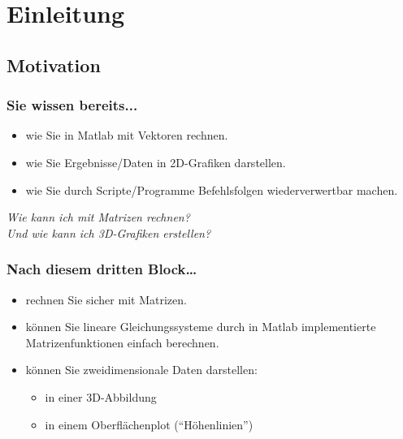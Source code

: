 



\setcounter{mchapter}{3}
\setcounter{mexercise}{0}


  

    \section{Einleitung}

    \subsection{Motivation}
    \begin{frame}
        \frametitle{Sie wissen bereits...}
        \begin{itemize}
            \item wie Sie in Matlab mit Vektoren rechnen.
            \item wie Sie Ergebnisse/Daten in 2D-Grafiken darstellen.
            \item wie Sie durch Scripte/Programme Befehlsfolgen wiederverwertbar machen.
        \end{itemize}

        \textit{Wie kann ich mit Matrizen rechnen?} \\
        \textit{Und wie kann ich 3D-Grafiken erstellen?}
    \end{frame}

    \begin{frame}
        \frametitle{Nach diesem dritten Block…}
        \begin{itemize}
            \item rechnen Sie sicher mit Matrizen.
            \item können Sie lineare Gleichungssysteme durch in Matlab implementierte Matrizenfunktionen einfach berechnen.
            \item können Sie zweidimensionale Daten darstellen:
            \begin{itemize}
                \item in einer 3D-Abbildung
                \item in einem Oberflächenplot (``Höhenlinien'')
            \end{itemize}
        \end{itemize}
    \end{frame}


